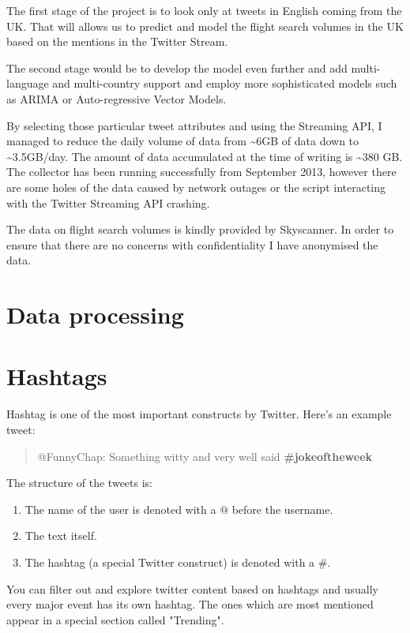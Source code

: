 \documentclass[minf,frontabs,twoside,singlespacing,parskip]{infthesis}
\begin{document}
The first stage of the project is to look only at tweets in English coming from the UK. That will allows us to predict and model the flight search volumes in the UK based on the mentions in the Twitter Stream.

The second stage would be to develop the model even further and add multi-language and multi-country support and employ more sophisticated models such as ARIMA or Auto-regressive Vector Models.

By selecting those particular tweet attributes and using the Streaming API, I managed to reduce the daily volume of data from \textasciitilde 6GB of data down to \textasciitilde 3.5GB/day.
The amount of data accumulated at the time of writing is \textasciitilde 380 GB. The collector has been running successfully from September 2013, however there are some holes of the data caused by network outages or the script interacting with the Twitter Streaming API crashing. 

The data on flight search volumes is kindly provided by Skyscanner. In order to ensure that there are no concerns with confidentiality I have anonymised the data. 

\section{Data processing}
\label{sec:dp}

\section{Hashtags}
\label{sec:hashtag}

Hashtag is one of the most important constructs by Twitter. Here's an example tweet:

\begin{quotation}
@FunnyChap: Something witty and very well said \bf{\#jokeoftheweek}
\end{quotation}

The structure of the tweets is:
\begin{enumerate}
\item The name of the user is denoted with a @ before the username.
\item The text itself.
\item The hashtag (a special Twitter construct) is denoted with a \#.
\end{enumerate}

You can filter out and explore twitter content based on hashtags and usually every major event has its own hashtag. The ones which are most mentioned appear in a special section called "Trending".
\end{document}
